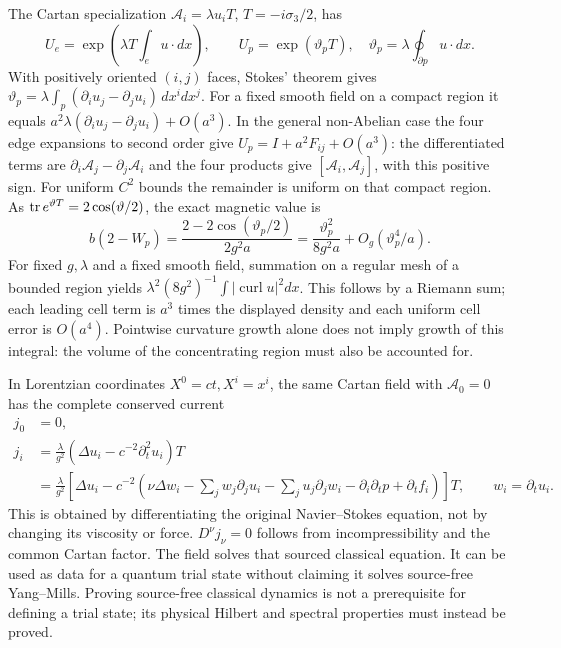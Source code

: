 The Cartan specialization $\mathcal A_i=\lambda u_iT$, $T=-i\sigma_3/2$,
has
\[
 U_e=\exp\left(\lambda T\int_e u\cdot dx\right),\qquad
 U_p=\exp(\vartheta_pT),\quad
 \vartheta_p=\lambda\oint_{\partial p}u\cdot dx .
\]
With positively oriented $(i,j)$ faces, Stokes' theorem gives
$\vartheta_p=\lambda\int_p(\partial_i u_j-\partial_j u_i)\,dx^i dx^j$.
For a fixed smooth field on a compact region it equals
$a^2\lambda(\partial_i u_j-\partial_j u_i)+O(a^3)$.
In the general non-Abelian case the four edge expansions to second order
give $U_p=I+a^2F_{ij}+O(a^3)$: the differentiated terms are
$\partial_i\mathcal A_j-\partial_j\mathcal A_i$ and the four products
give $[\mathcal A_i,\mathcal A_j]$, with this positive sign.
For uniform $C^2$ bounds the remainder is uniform on that compact region.
As $\operatorname{tr} e^{\vartheta T}=2\cos(\vartheta/2)$, the exact magnetic value is
\begin{equation}\label{eq:fabel-magnetic-value}
 b(2-W_p)=\frac{2-2\cos(\vartheta_p/2)}{2g^2a}
       =\frac{\vartheta_p^2}{8g^2a}
          +O_g(\vartheta_p^4/a).
\end{equation}
For fixed $g,\lambda$ and a fixed smooth field, summation on a regular
mesh of a bounded region yields
$\lambda^2(8g^2)^{-1}\int|\operatorname{curl}u|^2dx$.
This follows by a Riemann sum; each leading cell term is $a^3$ times the
displayed density and each uniform cell error is $O(a^4)$.
Pointwise curvature growth alone does not imply growth of this integral:
the volume of the concentrating region must also be accounted for.

In Lorentzian coordinates $X^0=ct,X^i=x^i$, the same Cartan field with
$\mathcal A_0=0$ has the complete conserved current
\begin{align*}
 j_0&=0,\\
 j_i&=\frac{\lambda}{g^2}
       (\Delta u_i-c^{-2}\partial_t^2u_i)T\\
 &=\frac{\lambda}{g^2}\left[
 \Delta u_i-c^{-2}\left(\nu\Delta w_i
 -\sum_jw_j\partial_ju_i-\sum_ju_j\partial_jw_i
 -\partial_i\partial_tp+\partial_tf_i\right)\right]T,\qquad w_i=\partial_tu_i.
\end{align*}
This is obtained by differentiating the original Navier--Stokes equation,
not by changing its viscosity or force. $D^\nu j_\nu=0$ follows from
incompressibility and the common Cartan factor. The field solves that
sourced classical equation. It can be used as data for a quantum trial
state without claiming it solves source-free Yang--Mills. Proving
source-free classical dynamics is not a prerequisite for defining a trial
state; its physical Hilbert and spectral properties must instead be proved.

